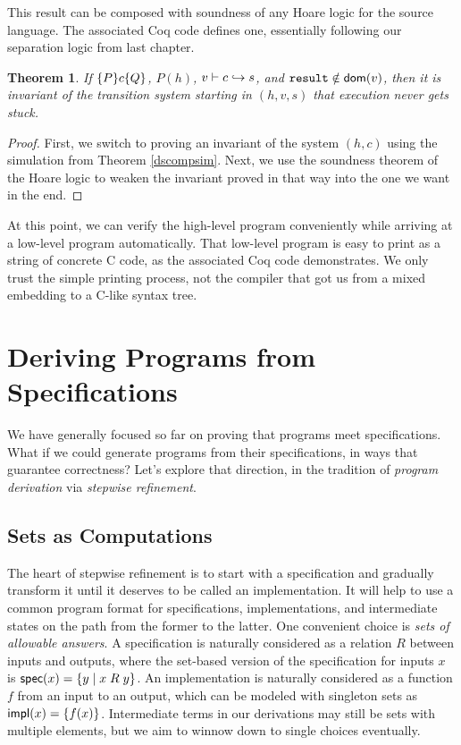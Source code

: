 \documentclass{amsbook}
\newtheorem{theorem}{Theorem}[chapter]
\theoremstyle{definition}
\theoremstyle{remark}
\numberwithin{section}{chapter}
\numberwithin{equation}{chapter}
\begin{document}
This result can be composed with soundness of any Hoare logic for the source language.
The associated Coq code defines one, essentially following our separation logic from last chapter.

\begin{theorem}
  If $\{P\} c \{Q\}$, $P(h)$, $v \vdash c \hookrightarrow s$, and $\texttt{result} \notin \mathsf{dom}(v)$, then it is invariant of the transition system starting in $(h, v, s)$ that execution never gets stuck.
\end{theorem}
\begin{proof}
  First, we switch to proving an invariant of the system $(h, c)$ using the simulation from Theorem \ref{dscompsim}.
  Next, we use the soundness theorem of the Hoare logic to weaken the invariant proved in that way into the one we want in the end.
\end{proof}

At this point, we can verify the high-level program conveniently while arriving at a low-level program automatically.
That low-level program is easy to print as a string of concrete C code, as the associated Coq code demonstrates.
We only trust the simple printing process, not the compiler that got us from a mixed embedding to a C-like syntax tree.



\chapter{Deriving Programs from Specifications}\label{deriving}

We have generally focused so far on proving that programs meet specifications.
What if we could generate programs from their specifications, in ways that guarantee correctness?
Let's explore that direction, in the tradition of \emph{program derivation} via \emph{stepwise refinement}.

\section{Sets as Computations}

The heart of stepwise refinement is to start with a specification and gradually transform it until it deserves to be called an implementation.
It will help to use a common program format for specifications, implementations, and intermediate states on the path from the former to the latter.
One convenient choice is \emph{sets of allowable answers}.
A specification is naturally considered as a relation $R$ between inputs and outputs, where the set-based version of the specification for inputs $x$ is $\mathsf{spec}(x) = \{y \mid x \; R \; y\}$.
An implementation is naturally considered as a function $f$ from an input to an output, which can be modeled with singleton sets as $\mathsf{impl}(x) = \{f(x)\}$.
Intermediate terms in our derivations may still be sets with multiple elements, but we aim to winnow down to single choices eventually.
\end{document}
